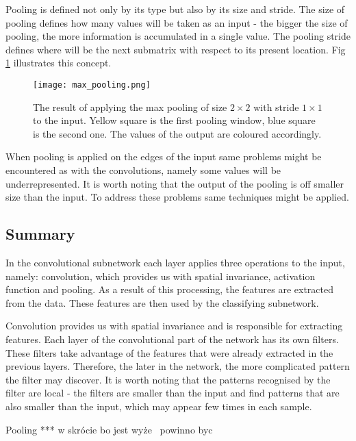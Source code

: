 \documentclass[a4paper,10pt]{report}
\begin{document}
	  Pooling is defined not only by its type but also by its size and stride. The size of pooling defines how many values will be taken as an input - the bigger the size of pooling, the more information is accumulated in a single value. The pooling stride defines where will be the next submatrix with respect to its present location. Fig \ref{fig:max_pooling} illustrates this concept. 
	  
	  \begin{figure}[h!]
	    \centering
	    \texttt{[image: max\_pooling.png]}
	    \caption{The result of applying the max pooling of size $2\times2$ with stride $1\times1$ to the input. Yellow square is the first pooling window, blue square is the second one. The values of the output are coloured accordingly.}
	    \label{fig:max_pooling}
	  \end{figure} 
  
	  When pooling is applied on the edges of the input same problems might be encountered as with the convolutions, namely some values will be underrepresented. It is worth noting that the output of the pooling is off smaller size than the input. To address these problems same techniques might be applied. 
	  
	  
	\subsection{Summary}
	  In the convolutional subnetwork each layer applies three operations to the input, namely: convolution, which provides us with spatial invariance, activation function and pooling. As a result of this processing, the features are extracted from the data. These features are then used by the classifying subnetwork. 
	  
	  Convolution provides us with spatial invariance and is responsible for extracting features. Each layer of the convolutional part of the network has its own filters. These filters take advantage of the features that were already extracted in the previous layers. Therefore, the later in the network, the more complicated pattern the filter may discover. It is worth noting that the patterns recognised by the filter are local - the filters are smaller than the input and find patterns that are also smaller than the input, which may appear few times in each sample. 
	  
	  Pooling *** w skrócie bo jest wyże \ powinno byc
	  
\end{document}
